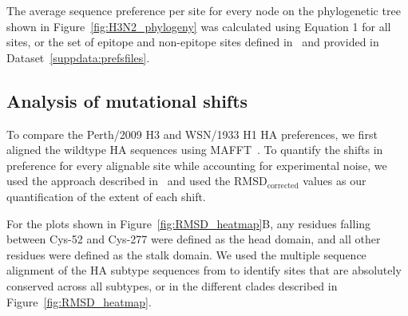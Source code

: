 \documentclass[9pt,twocolumn,twoside]{pnas-new}
\begin{document}
{The average sequence preference per site for every node on the phylogenetic tree shown in Figure~\ref{fig:H3N2_phylogeny} was calculated using Equation 1 for all sites, or the set of epitope and non-epitope sites defined in~\cite{wolf2006long} and provided in Dataset~\ref{suppdata:prefsfiles}.

\subsection*{Analysis of mutational shifts}
To compare the Perth/2009 H3 and WSN/1933 H1 HA preferences, we first aligned the wildtype HA sequences using MAFFT~\cite{katoh2013mafft}.
To quantify the shifts in preference for every alignable site while accounting for experimental noise, we used the approach described in~\cite{haddox2017mapping} and used the RMSD$_{\text{corrected}}$ values as our quantification of the extent of each shift.

For the plots shown in Figure~\ref{fig:RMSD_heatmap}B, any residues falling between Cys-52 and Cys-277 were defined as the head domain, and all other residues were defined as the stalk domain.
We used the multiple sequence alignment of the HA subtype sequences from \cite{doud2017quantifying} to identify sites that are absolutely conserved across all subtypes, or in the different clades described in Figure~\ref{fig:RMSD_heatmap}.
}

\showmatmethods{} %


\showacknow{} %

\end{document}
